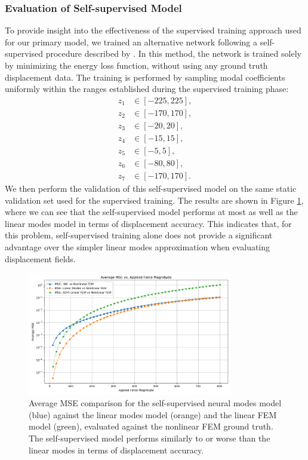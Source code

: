 \subsubsection{Evaluation of Self-supervised Model}
\label{sec:evaluation_self_supervised}
To provide insight into the effectiveness of the supervised training approach used for our primary model, we trained an alternative network following a self-supervised procedure described by \cite{Wang_Du_Coros_Thomaszewski_2024}. In this method, the network is trained solely by minimizing the energy loss function, without using any ground truth displacement data. The training is performed by sampling modal coefficients uniformly within the ranges established during the supervised training phase:
\begin{align*}
    z_1 &\in [-225, 225], \\
    z_2 &\in [-170, 170], \\
    z_3 &\in [-20, 20], \\
    z_4 &\in [-15, 15], \\
    z_5 &\in [-5, 5], \\
    z_6 &\in [-80, 80], \\
    z_7 &\in [-170, 170].
\end{align*}
We then perform the validation of this self-supervised model on the same static validation set used for the supervised training. The results are shown in Figure \ref{fig:self_supervised_validation_mse_comparison}, where we can see that the self-supervised model performs at most as well as the linear modes model in terms of displacement accuracy. This indicates that, for this problem, self-supervised training alone does not provide a significant advantage over the simpler linear modes approximation when evaluating displacement fields.

\begin{figure}[H]
    \centering
    \includegraphics[width=0.8\textwidth]{Images/self_supervised_mse.png}
    \caption{Average MSE comparison for the self-supervised neural modes model (blue) against the linear modes model (orange) and the linear FEM model (green), evaluated against the nonlinear FEM ground truth. The self-supervised model performs similarly to or worse than the linear modes in terms of displacement accuracy.}
    \label{fig:self_supervised_validation_mse_comparison}
\end{figure}

